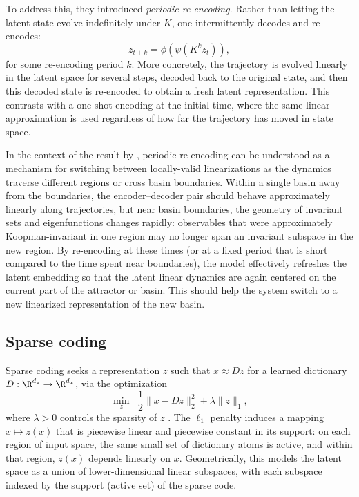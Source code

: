 To address this, they introduced \emph{periodic re-encoding}.
Rather than letting the latent state evolve indefinitely under $K$, one intermittently decodes and re-encodes:
\begin{equation}
z_{t+k} = \phi\!\left(\psi\!\left(K^k z_t\right)\right),
\end{equation}
for some re-encoding period $k$.
More concretely, the trajectory is evolved linearly in the latent space for several steps, decoded back to the original state, and then this decoded state is re-encoded to obtain a fresh latent representation.
This contrasts with a one-shot encoding at the initial time, where the same linear approximation is used regardless of how far the trajectory has moved in state space.

In the context of the result by \citet{lan_linearization_2013}, periodic re-encoding can be understood as a mechanism for switching between locally-valid linearizations as the dynamics traverse different regions or cross basin boundaries.
Within a single basin away from the boundaries, the encoder–decoder pair should behave approximately linearly along trajectories, but near basin boundaries, the geometry of invariant sets and eigenfunctions changes rapidly: observables that were approximately Koopman-invariant in one region may no longer span an invariant subspace in the new region.
By re-encoding at these times (or at a fixed period that is short compared to the time spent near boundaries), the model effectively refreshes the latent embedding so that the latent linear dynamics are again centered on the current part of the attractor or basin. This should help the system switch to a new linearized representation of the new basin.

\subsection{Sparse coding}
\label{sec:background-sparse}

Sparse coding seeks a representation $z$ such that $x \approx Dz$ for a learned dictionary $D : \R^{d_z} \to \R^{d_x}$, via the optimization
\begin{equation}
\min_z \;\; \frac{1}{2} \|x - D z\|_2^2 + \lambda \|z\|_1,
\end{equation}
where $\lambda > 0$ controls the sparsity of $z$ \citep{olshausen_emergence_1996, chen_atomic_1998, donoho_optimally_2003}.
The $\ell_1$ penalty induces a mapping $x \mapsto z(x)$ that is piecewise linear and piecewise constant in its support: on each region of input space, the same small set of dictionary atoms is active, and within that region, $z(x)$ depends linearly on $x$.
Geometrically, this models the latent space as a union of lower-dimensional linear subspaces, with each subspace indexed by the support (active set) of the sparse code.

